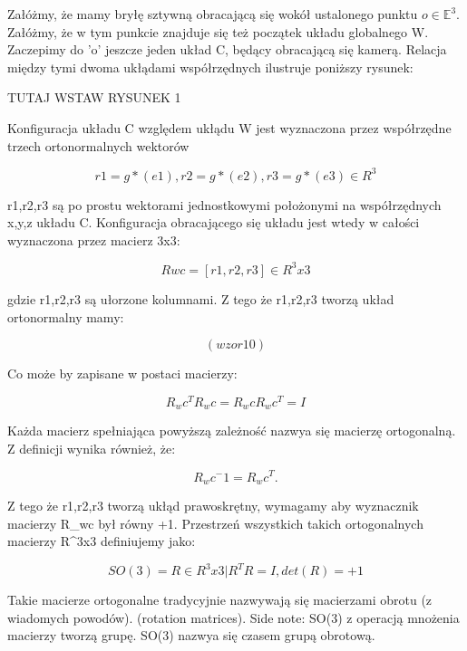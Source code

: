 \documentclass[a4paper,12pt]{article}
\newcommand{\E}{\mathbb{E}}
\begin{document}
Załóżmy, że mamy bryłę sztywną obracającą się wokół ustalonego punktu $o \in \E^3$. Załóżmy, że w tym punkcie znajduje się też początek układu globalnego W. Zaczepimy do 'o' jeszcze jeden układ C, będący obracającą się kamerą. Relacja między tymi dwoma ukłądami współrzędnych ilustruje poniższy rysunek:

TUTAJ WSTAW RYSUNEK 1

Konfiguracja układu C względem ukłądu W jest wyznaczona przez współrzędne trzech ortonormalnych wektorów 

\begin{equation}
r1=g*(e1), r2=g*(e2), r3=g*(e3) \in R^3
\end{equation}

r1,r2,r3 są po prostu wektorami jednostkowymi położonymi na współrzędnych x,y,z układu C. Konfiguracja obracającego się układu jest wtedy w całości wyznaczona przez macierz 3x3:

\begin{equation}
Rwc = [r1,r2,r3] \in R^3x3 
\end{equation}

gdzie r1,r2,r3 są ułorzone kolumnami. Z tego że r1,r2,r3 tworzą układ ortonormalny mamy:

\begin{equation}
(wzor 10)
\end{equation}

Co może by zapisane w postaci macierzy:

\begin{equation}
R_wc^TR_wc = R_wcR_wc^T = I
\end{equation}

Każda macierz spełniająca powyższą zależność nazwya się macierzę ortogonalną. Z definicji wynika również, że:

\begin{equation}
R_wc^-1 = R_wc^T. 
\end{equation}

Z tego że r1,r2,r3 tworzą ukłąd prawoskrętny, wymagamy aby wyznacznik macierzy R_wc był równy +1. Przestrzeń wszystkich takich ortogonalnych macierzy \in R^3x3 definiujemy jako:

\begin{equation}
SO(3)={R \in R^3x3 | R^TR = I, det(R)=+1}
\end{equation}

Takie macierze ortogonalne tradycyjnie nazwywają się macierzami obrotu (z wiadomych powodów). (rotation matrices). Side note: SO(3) z operacją mnożenia macierzy tworzą grupę. SO(3) nazwya się czasem grupą obrotową. 
\end{document}
